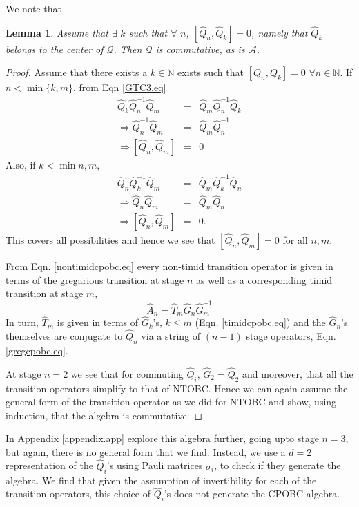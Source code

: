 \documentclass[11pt]{article}
\newtheorem{lemma}[theorem]{Lemma}
\newcommand{\hA}{\hat { A}}
\newcommand{\hG}{\hat G}
\newcommand{\hQ}{\hat Q}
\newcommand{\cA}{\mathcal A}
\newcommand{\hT}{\widehat T}
\newcommand{\cQ}{\mathcal Q}
\newcommand{\h}{\hat}
\begin{document}
We note that 
\begin{lemma}
Assume that  $\exists \, \, k$ such that $\forall \, \,  n$, $[\h Q_n,\h
Q_k]=0$, namely that $\hQ_k$ belongs to the center of $\cQ$. Then 
$\cQ$ is commutative, as is  $\cA$. 
\end{lemma}
\begin{proof}
Assume that there exists a $k\in \mathbb{N}$ exists such that $[Q_n,Q_k]=0$
$\forall n\in \mathbb{N}$. If $n<\min \{k,m\}$, from Eqn \ref{GTC3.eq} 
\begin{eqnarray}
\h Q_k\h Q_n^{-1}\h Q_m&=&\hQ_m\hQ_n^{-1}\hQ_k               \nonumber \\
\Rightarrow \hQ_n^{-1}\hQ_m&=&\hQ_m\hQ_n^{-1}  \nonumber \\
\Rightarrow [\hQ_n,\hQ_m]&=&0
\end{eqnarray}
Also, if $k<\min{n,m}$, 
\begin{eqnarray}
\hQ_n\hQ_k^{-1}\hQ_m&=&\hQ_m\hQ_k^{-1}\hQ_n   \nonumber\\
\Rightarrow \hQ_n\hQ_m&=&\hQ_m\hQ_n  \nonumber  \\
\Rightarrow [\hQ_n,\hQ_m]&=&0. 
\end{eqnarray}
This covers all possibilities and hence we see that  $[\hQ_n,\hQ_m]=0$
for all $n,m$.

From Eqn. \eqref{nontimidcpobc.eq} every non-timid transition operator is given
in terms of the gregarious transition at stage $n$ as well as a 
corresponding timid transition at stage $m$,
\begin{equation}
  \hA_n=\hT_m\hG_n \hG_m^{-1}
\end{equation} 
In turn,  $\hT_m$ is given in terms of $\hG_k$'s, $k \leq m$  (Eqn. \eqref{timidcpobc.eq})
and the $\hG_n$'s themselves are conjugate to $\hQ_n$ via a string of
$(n-1)$ stage operators, Eqn. \eqref{gregcpobc.eq}.  
 
At stage $n=2$ we see that for commuting $\hQ_i$,
$\hG_2=\hQ_2$ and moreover, that all the transition operators simplify
to that of NTOBC.  Hence we can again assume the general form of the
transition operator as we did for NTOBC and show, using induction,
that the algebra is commutative. 


\end{proof}
In  Appendix \ref{appendix.app} explore this algebra further, going
upto stage $n=3$, but again, there is no general form that we
find. Instead, we use a $d=2$
representation of the $\h Q_i$'s  using Pauli matrices $\sigma_i$, to
check if they generate the algebra. We find that given the assumption
of invertibility for each of the transition operators, this choice of
$\h Q_i$'s does not generate the CPOBC algebra. 
\end{document}
